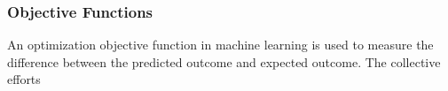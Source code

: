 \subsubsection{Objective Functions}
An optimization objective function in machine learning is used to measure the difference between the predicted outcome and expected outcome. The collective efforts 